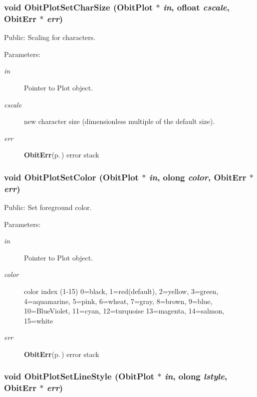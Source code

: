 \subsubsection{\setlength{\rightskip}{0pt plus 5cm}void Obit\-Plot\-Set\-Char\-Size ({\bf Obit\-Plot} $\ast$ {\em in}, {\bf ofloat} {\em cscale}, {\bf Obit\-Err} $\ast$ {\em err})}\label{ObitPlot_8h_a18}


Public: Scaling for characters. 

\begin{Desc}
\item[Parameters:]
\begin{description}
\item[{\em in}]Pointer to Plot object. \item[{\em cscale}]new character size (dimensionless multiple of the default size). \item[{\em err}]{\bf Obit\-Err}{\rm (p.\,\pageref{structObitErr})} error stack \end{description}
\end{Desc}
\subsubsection{\setlength{\rightskip}{0pt plus 5cm}void Obit\-Plot\-Set\-Color ({\bf Obit\-Plot} $\ast$ {\em in}, {\bf olong} {\em color}, {\bf Obit\-Err} $\ast$ {\em err})}\label{ObitPlot_8h_a21}


Public: Set foreground color. 

\begin{Desc}
\item[Parameters:]
\begin{description}
\item[{\em in}]Pointer to Plot object. \item[{\em color}]color index (1-15) 0=black, 1=red(default), 2=yellow, 3=green, 4=aquamarine, 5=pink, 6=wheat, 7=gray, 8=brown, 9=blue, 10=Blue\-Violet, 11=cyan, 12=turquoise 13=magenta, 14=salmon, 15=white \item[{\em err}]{\bf Obit\-Err}{\rm (p.\,\pageref{structObitErr})} error stack \end{description}
\end{Desc}
\subsubsection{\setlength{\rightskip}{0pt plus 5cm}void Obit\-Plot\-Set\-Line\-Style ({\bf Obit\-Plot} $\ast$ {\em in}, {\bf olong} {\em lstyle}, {\bf Obit\-Err} $\ast$ {\em err})}\label{ObitPlot_8h_a20}


